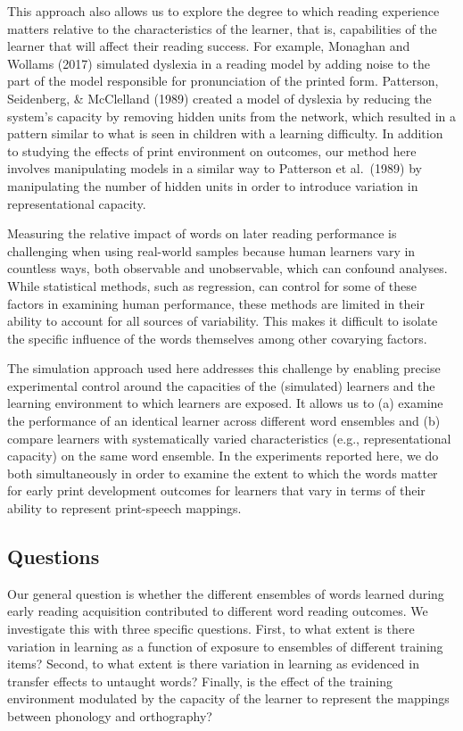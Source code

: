 \documentclass[
  ,man,floatsintext]{apa6}
\begin{document}
This approach also allows us to explore the degree to which reading experience matters relative to the characteristics of the learner, that is, capabilities of the learner that will affect their reading success. For example, Monaghan and Wollams (2017) simulated dyslexia in a reading model by adding noise to the part of the model responsible for pronunciation of the printed form. Patterson, Seidenberg, \& McClelland (1989) created a model of dyslexia by reducing the system's capacity by removing hidden units from the network, which resulted in a pattern similar to what is seen in children with a learning difficulty. In addition to studying the effects of print environment on outcomes, our method here involves manipulating models in a similar way to Patterson et al.~(1989) by manipulating the number of hidden units in order to introduce variation in representational capacity.

Measuring the relative impact of words on later reading performance is challenging when using real-world samples because human learners vary in countless ways, both observable and unobservable, which can confound analyses. While statistical methods, such as regression, can control for some of these factors in examining human performance, these methods are limited in their ability to account for all sources of variability. This makes it difficult to isolate the specific influence of the words themselves among other covarying factors.

The simulation approach used here addresses this challenge by enabling precise experimental control around the capacities of the (simulated) learners and the learning environment to which learners are exposed. It allows us to (a) examine the performance of an identical learner across different word ensembles and (b) compare learners with systematically varied characteristics (e.g., representational capacity) on the same word ensemble. In the experiments reported here, we do both simultaneously in order to examine the extent to which the words matter for early print development outcomes for learners that vary in terms of their ability to represent print-speech mappings.

\hypertarget{questions}{%
\subsection{Questions}\label{questions}}

Our general question is whether the different ensembles of words learned during early reading acquisition contributed to different word reading outcomes. We investigate this with three specific questions. First, to what extent is there variation in learning as a function of exposure to ensembles of different training items? Second, to what extent is there variation in learning as evidenced in transfer effects to untaught words? Finally, is the effect of the training environment modulated by the capacity of the learner to represent the mappings between phonology and orthography?
\end{document}
